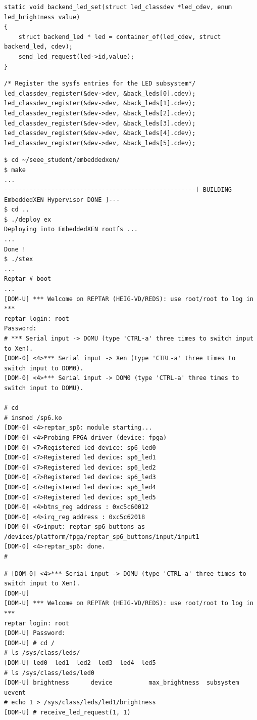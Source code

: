 \begin{lstlisting}
static void backend_led_set(struct led_classdev *led_cdev, enum led_brightness value)
{
	struct backend_led * led = container_of(led_cdev, struct backend_led, cdev);
	send_led_request(led->id,value);
}
\end{lstlisting}
\begin{lstlisting}
/* Register the sysfs entries for the LED subsystem*/
led_classdev_register(&dev->dev, &back_leds[0].cdev);
led_classdev_register(&dev->dev, &back_leds[1].cdev);
led_classdev_register(&dev->dev, &back_leds[2].cdev);
led_classdev_register(&dev->dev, &back_leds[3].cdev);
led_classdev_register(&dev->dev, &back_leds[4].cdev);
led_classdev_register(&dev->dev, &back_leds[5].cdev);
\end{lstlisting}
\begin{lstlisting}
$ cd ~/seee_student/embeddedxen/
$ make
...
-----------------------------------------------------[ BUILDING EmbeddedXEN Hypervisor DONE ]---
$ cd ..
$ ./deploy ex
Deploying into EmbeddedXEN rootfs ...
...
Done !
$ ./stex
...
Reptar # boot
...
[DOM-U] *** Welcome on REPTAR (HEIG-VD/REDS): use root/root to log in ***
reptar login: root
Password: 
# *** Serial input -> DOMU (type 'CTRL-a' three times to switch input to Xen).
[DOM-0] <4>*** Serial input -> Xen (type 'CTRL-a' three times to switch input to DOM0).
[DOM-0] <4>*** Serial input -> DOM0 (type 'CTRL-a' three times to switch input to DOMU).

# cd
# insmod /sp6.ko
[DOM-0] <4>reptar_sp6: module starting...
[DOM-0] <4>Probing FPGA driver (device: fpga)
[DOM-0] <7>Registered led device: sp6_led0
[DOM-0] <7>Registered led device: sp6_led1
[DOM-0] <7>Registered led device: sp6_led2
[DOM-0] <7>Registered led device: sp6_led3
[DOM-0] <7>Registered led device: sp6_led4
[DOM-0] <7>Registered led device: sp6_led5
[DOM-0] <4>btns_reg address : 0xc5c60012
[DOM-0] <4>irq_reg address : 0xc5c62018
[DOM-0] <6>input: reptar_sp6_buttons as /devices/platform/fpga/reptar_sp6_buttons/input/input1
[DOM-0] <4>reptar_sp6: done.
#
\end{lstlisting}
\begin{lstlisting}
# [DOM-0] <4>*** Serial input -> DOMU (type 'CTRL-a' three times to switch input to Xen).
[DOM-U] 
[DOM-U] *** Welcome on REPTAR (HEIG-VD/REDS): use root/root to log in ***
reptar login: root
[DOM-U] Password: 
[DOM-U] # cd /
# ls /sys/class/leds/
[DOM-U] led0  led1  led2  led3  led4  led5
# ls /sys/class/leds/led0
[DOM-U] brightness      device          max_brightness  subsystem       uevent
# echo 1 > /sys/class/leds/led1/brightness 
[DOM-U] # receive_led_request(1, 1)
\end{lstlisting}
